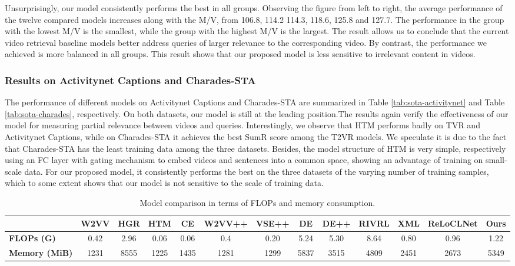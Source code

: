 \documentclass[sigconf]{acmart}
\begin{document}
Unsurprisingly, our model consistently performs the best in all groups.
Observing the figure from left to right, the average performance of the twelve compared models increases along with the M/V, from 106.8, 114.2 114.3, 118.6, 125.8 and 127.7.
The performance in the group with the lowest M/V is the smallest, while the group with the highest M/V is the largest.
The result allows us to conclude that the current video retrieval baseline models better address queries of larger relevance to the corresponding video. 
By contrast, the performance we achieved is more balanced in all groups. This result shows that our proposed model is less sensitive to irrelevant content in videos.


\subsubsection{Results on Activitynet Captions and Charades-STA}

The performance of different models on Activitynet Captions and Charades-STA are summarized in Table \ref{tab:sota-activitynet} and Table \ref{tab:sota-charades}, respectively.
On both datasets, our model is still at the leading position.The results again verify the effectiveness of our model for measuring partial relevance between videos and queries.
Interestingly, we observe that HTM performs badly on TVR and Activitynet Captions, while on Charades-STA it achieves the best SumR score among the T2VR models. We speculate it is due to the fact that Charades-STA has the least training data among the three datasets. Besides, the model structure of HTM is very simple, respectively using an FC layer with gating mechanism to embed videos and sentences into a common space, showing an advantage of training on small-scale data.
For our proposed model, it consistently performs the best on the three datasets of the varying number of training samples, which to some extent shows that our model is not sensitive to the scale of training data.




\begin{table*}[tb!]
\caption{Model comparison in terms of FLOPs and memory consumption.}
\vspace{-3mm}
\label{consumption}
\begin{tabular}{llcccccccccccc}
\toprule
\multicolumn{2}{l}{} & W2VV & HGR & HTM & CE & W2VV++ & VSE++ & DE & DE++ & RIVRL & XML & ReLoCLNet & Ours \\
\hline
\multicolumn{2}{l}{\textbf{FLOPs (G)}} & 0.42  & 2.96  & 0.06  & 0.06  & 0.4  & 0.20  & 5.24  & 5.30  & 8.64  & 0.80  & 0.96   & 1.22  \\
\hline
\multicolumn{2}{l}{\textbf{Memory (MiB)}} & 1231 & 8555  & 1225  & 1435 & 1281 & 1299 & 5837 & 3515  & 4809  & 2451  & 2673  & 5349\\
\bottomrule
\end{tabular}

\end{table*}
\end{document}
